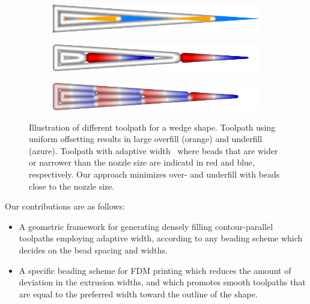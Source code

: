 \begin{figure}\centering
\setlength{\figwidth}{.9\columnwidth}
\setlength{\figwidthTwo}{.05\columnwidth}
\begin{subfigure}{\figwidth}\centering
\parbox[b]{\figwidthTwo}{\subcaption{}\label{intro_wedge_uniform}}\includegraphics[width=\figwidth]{sources-intro-TEST-naive-accuracy.png}
\end{subfigure}
\begin{subfigure}{\figwidth}\centering
\parbox[b]{\figwidthTwo}{\subcaption{}\label{intro_wedge_centered}}\includegraphics[width=\figwidth]{sources-intro-TEST-Center-widths.png}
\end{subfigure}
\begin{subfigure}{\figwidth}\centering
\parbox[b]{\figwidthTwo}{\subcaption{}\label{intro_wedge_distributed}}\includegraphics[width=\figwidth]{sources-intro-TEST-InwardDistributed-widths.png}
\end{subfigure}
\caption{
Illustration of different toolpath for a wedge shape.
 Toolpath using uniform offsetting results in large overfill (orange) and underfill (azure).
 Toolpath with adaptive width~\cite{Jin2017JMS} where beads that are wider or narrower than the nozzle size are indicatd in red and blue, respectively.
 Our approach minimizes over- and underfill with beads close to the nozzle size.
}
\label{intro_wedge}
\end{figure}


Our contributions are as follows:
\begin{itemize}
\item A geometric framework for generating densely filling contour-parallel toolpaths employing adaptive width, according to any beading scheme which decides on the bead spacing and widths.
\item A specific beading scheme for FDM printing which reduces the amount of deviation in the extrusion widths, and which promotes smooth toolpaths that are equal to the preferred width toward the outline of the shape.
\end{itemize}





